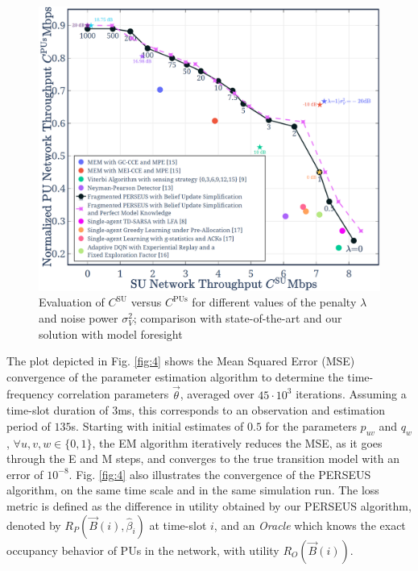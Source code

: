\documentclass[10pt,twocolumn]{IEEEtran}
\begin{document}
\begin{figure}[t]
    \centering
    \includegraphics[width=0.86\linewidth]{Evaluation_2.png}
    \caption{Evaluation of $C^{\text{SU}}$ versus $C^{\text{PUs}}$ for different values of the penalty $\lambda$ and noise power $\sigma_{V}^{2}$; comparison with state-of-the-art and our solution with model foresight}
    \label{fig:8}
    \vspace{-6mm}
\end{figure}

The plot depicted in Fig. \ref{fig:4} shows the Mean Squared Error (MSE) convergence of the parameter estimation algorithm to determine the time-frequency correlation parameters $\vec{\theta}$, averaged over $45{\cdot} 10^3$ iterations. Assuming a time-slot duration of $3$ms, this corresponds to an observation and estimation period of $135$s. Starting with initial estimates of $0.5$ for the parameters $p_{uv}$ and $q_{w}$, ${\forall}u,v,w{\in}\{0,1\}$, the EM algorithm iteratively reduces the MSE, as it goes through the E and M steps, and converges to the true transition model with an error of $10^{-8}$. Fig. \ref{fig:4} also illustrates the convergence of the PERSEUS algorithm, on the same time scale and in the same simulation run. The loss metric is defined as the difference in utility obtained by our PERSEUS algorithm, denoted by $R_{P}(\vec{B}(i), \hat{\beta}_{i})$ at time-slot $i$, and an \emph{Oracle} which knows the exact occupancy behavior of PUs in the network, with utility $R_{O}(\vec{B}(i))$.
\end{document}
